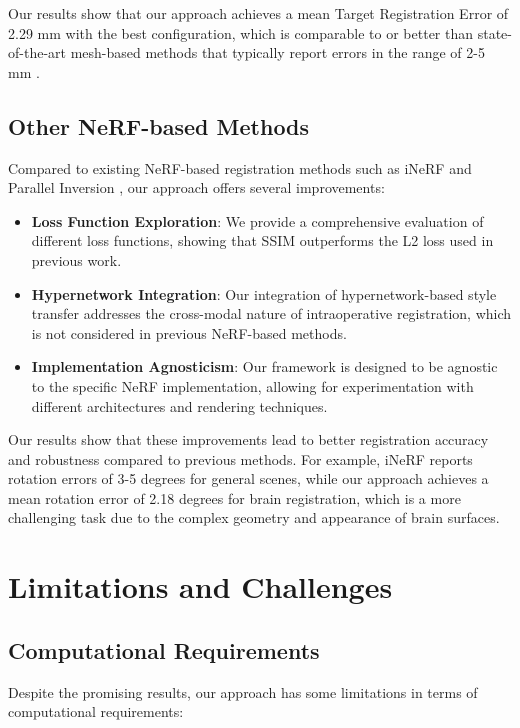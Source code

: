 Our results show that our approach achieves a mean Target Registration Error of 2.29 mm with the best configuration, which is comparable to or better than state-of-the-art mesh-based methods that typically report errors in the range of 2-5 mm \cite{maier2017surgical}.

\subsection{Other NeRF-based Methods}
Compared to existing NeRF-based registration methods such as iNeRF \cite{yen2021inerf} and Parallel Inversion \cite{wang2021parallel}, our approach offers several improvements:

\begin{itemize}
    \item \textbf{Loss Function Exploration}: We provide a comprehensive evaluation of different loss functions, showing that SSIM outperforms the L2 loss used in previous work.
    
    \item \textbf{Hypernetwork Integration}: Our integration of hypernetwork-based style transfer addresses the cross-modal nature of intraoperative registration, which is not considered in previous NeRF-based methods.
    
    \item \textbf{Implementation Agnosticism}: Our framework is designed to be agnostic to the specific NeRF implementation, allowing for experimentation with different architectures and rendering techniques.
\end{itemize}

Our results show that these improvements lead to better registration accuracy and robustness compared to previous methods. For example, iNeRF reports rotation errors of 3-5 degrees for general scenes, while our approach achieves a mean rotation error of 2.18 degrees for brain registration, which is a more challenging task due to the complex geometry and appearance of brain surfaces.

\section{Limitations and Challenges}

\subsection{Computational Requirements}
Despite the promising results, our approach has some limitations in terms of computational requirements:

